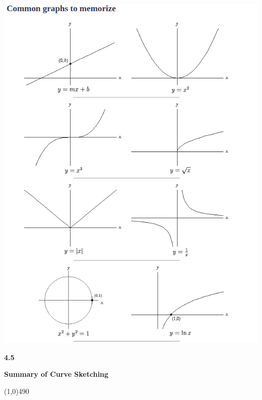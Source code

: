 \documentclass{report}
\begin{document}
  \pagebreak \bigbreak \noindent
  \begin{mdframed}
    \begin{center}
      \includegraphics[scale=.95]{ ./images/13.png }
    \end{center}
  \end{mdframed}

  \pagebreak \bigbreak \noindent
  \begin{Large}
      \begin{mdframed}
          \begin{center}
              \textbf{4.5}
          \end{center}
      \end{mdframed}
  \end{Large}
  \begin{Large}
      \begin{center}
          \textbf{Summary of Curve Sketching}
      \end{center}
  \end{Large}
  \line(1,0){490}
\end{document}
